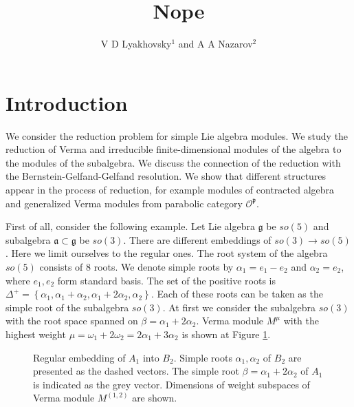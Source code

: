 \documentclass[12pt]{article}
\theoremstyle{definition}
\newcommand{\gf}{\mathfrak{g}}
\newcommand{\af}{\mathfrak{a}}
\begin{document}
\title{Nope}
\author{V D Lyakhovsky$^1$ and A A Nazarov$^2$}

\begin{abstract}
\end{abstract}

\section{Introduction}
\label{sec:introduction}

We consider the reduction problem for simple Lie algebra modules. We study the reduction of Verma and irreducible finite-dimensional modules of the algebra to the modules of the subalgebra. We discuss the connection of the reduction with the Bernstein-Gelfand-Gelfand resolution. We show that different structures appear in the process of reduction, for example modules of contracted algebra and generalized Verma modules from parabolic category $\mathcal{O}^{\mathfrak{p}}$.

First of all, consider the following example. 
Let Lie algebra $\gf$ be $so(5)$ and subalgebra $\af\subset \gf$ be $so(3)$. There are different embeddings of $so(3)\to so(5)$. Here we limit ourselves to the regular ones. 
The root system of the algebra $so(5)$ consists of 8 roots. We denote simple roots by $\alpha_{1}=e_{1}-e_{2}$ and $\alpha_{2}=e_{2}$, where $e_{1},e_{2}$ form standard basis. The set of the positive roots is $\Delta^{+}=\left\{\alpha_{1}, \alpha_{1}+\alpha_{2}, \alpha_{1}+2\alpha_{2}, \alpha_{2}\right\}$. Each of these roots can be taken as the simple root of the subalgebra $so(3)$. At first we consider the subalgebra $so(3)$ with the root space spanned on $\beta=\alpha_{1}+2\alpha_{2}$. Verma module $M^{\mu}$ with the highest weight $\mu=\omega_{1}+2\omega_{2}=2\alpha_{1}+3\alpha_{2}$ is shown at Figure \ref{fig:B2_Verma}.
\begin{figure}[h!bt]
  \noindent{}
  \caption{Regular embedding of $A_1$ into $B_2$. Simple roots $\alpha_1, \alpha_2$ of $B_2$ are presented as the dashed vectors.
    The simple root $\beta = \alpha_1+2\alpha_2$ of $A_1$ is indicated as the grey vector. Dimensions of weight subspaces of Verma module $M^{(1,2)}$ are shown.}
  
  \label{fig:B2_Verma}
\end{figure}
\end{document}
